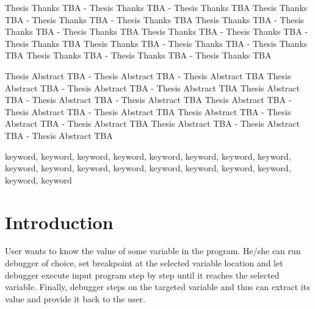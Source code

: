 \documentclass[12pt, twoside]{fithesis2}
\renewcommand{\_}{\leavevmode \kern0.07em\vbox{\hrule width0.4em}}
\begin{document}
\FrontMatter
\ThesisTitlePage

%
%
%
%

\begin{ThesisDeclaration}
    \DeclarationText
    \AdvisorName
\end{ThesisDeclaration}

\begin{ThesisThanks}
    Thesis Thanks TBA - Thesis Thanks TBA - Thesis Thanks TBA
    Thesis Thanks TBA - Thesis Thanks TBA - Thesis Thanks TBA
    Thesis Thanks TBA - Thesis Thanks TBA - Thesis Thanks TBA
    Thesis Thanks TBA - Thesis Thanks TBA - Thesis Thanks TBA
    Thesis Thanks TBA - Thesis Thanks TBA - Thesis Thanks TBA
    Thesis Thanks TBA - Thesis Thanks TBA - Thesis Thanks TBA
\end{ThesisThanks}

\begin{ThesisAbstract}
    Thesis Abstract TBA - Thesis Abstract TBA - Thesis Abstract TBA
    Thesis Abstract TBA - Thesis Abstract TBA - Thesis Abstract TBA
    Thesis Abstract TBA - Thesis Abstract TBA - Thesis Abstract TBA
    Thesis Abstract TBA - Thesis Abstract TBA - Thesis Abstract TBA
    Thesis Abstract TBA - Thesis Abstract TBA - Thesis Abstract TBA
    Thesis Abstract TBA - Thesis Abstract TBA - Thesis Abstract TBA
\end{ThesisAbstract}

\begin{ThesisKeyWords}
    keyword, keyword, keyword, keyword, keyword, keyword,
    keyword, keyword, keyword, keyword, keyword, keyword,
    keyword, keyword, keyword, keyword, keyword, keyword
\end{ThesisKeyWords}


\MainMatter
\tableofcontents



\chapter{Introduction}
\label{chap:intro}

User wants to know the value of some variable in the program. He/she can run
debugger of choice, set breakpoint at the selected variable location and let
debugger execute input program step by step until it reaches the selected
variable. Finally, debugger steps on the targeted variable and thus can extract
its value and provide it back to the user.
\end{document}
